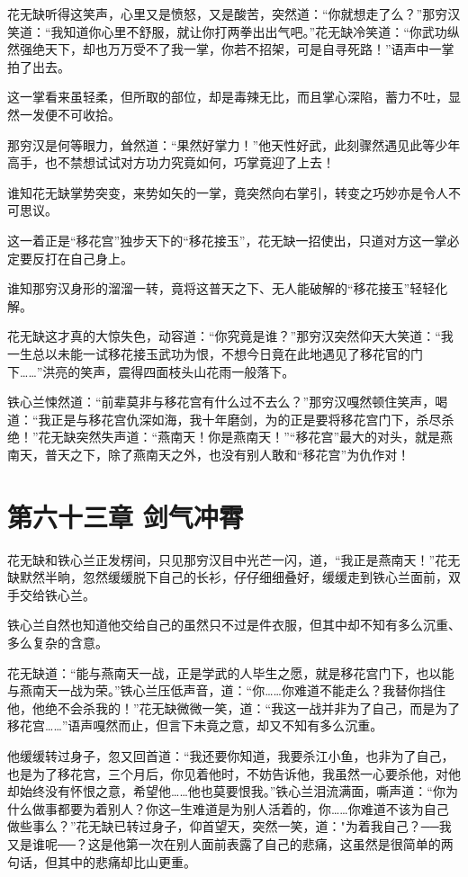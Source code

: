 \documentclass[12pt,oneside]{book}
\begin{document}
花无缺听得这笑声，心里又是愤怒，又是酸苦，突然道：``你就想走了么？''那穷汉笑道：``我知道你心里不舒服，就让你打两拳出出气吧。''花无缺冷笑道：``你武功纵然强绝天下，却也万万受不了我一掌，你若不招架，可是自寻死路！''语声中一掌拍了出去。

这一掌看来虽轻柔，但所取的部位，却是毒辣无比，而且掌心深陷，蓄力不吐，显然一发便不可收拾。

那穷汉是何等眼力，耸然道：``果然好掌力！''他天性好武，此刻骤然遇见此等少年高手，也不禁想试试对方功力究竟如何，巧掌竟迎了上去！

谁知花无缺掌势突变，来势如矢的一掌，竟突然向右掌引，转变之巧妙亦是令人不可思议。

这一着正是``移花宫''独步天下的``移花接玉''，花无缺一招使出，只道对方这一掌必定要反打在自己身上。

谁知那穷汉身形的溜溜一转，竟将这普天之下、无人能破解的``移花接玉''轻轻化解。

花无缺这才真的大惊失色，动容道：``你究竟是谁？''那穷汉突然仰天大笑道：``我一生总以未能一试移花接玉武功为恨，不想今日竟在此地遇见了移花官的门下\ldots\ldots{}''洪亮的笑声，震得四面枝头山花雨一般落下。

铁心兰悚然道：``前辈莫非与移花宫有什么过不去么？''那穷汉嘎然顿住笑声，喝道：``我正是与移花宫仇深如海，我十年磨剑，为的正是要将移花宫门下，杀尽杀绝！''花无缺突然失声道：``燕南天！你是燕南天！''``移花宫''最大的对头，就是燕南天，普天之下，除了燕南天之外，也没有别人敢和``移花宫''为仇作对！

\hypertarget{ux7b2cux516dux5341ux4e09ux7ae0-ux5251ux6c14ux51b2ux9704}{%
\chapter{第六十三章
剑气冲霄}\label{ux7b2cux516dux5341ux4e09ux7ae0-ux5251ux6c14ux51b2ux9704}}

花无缺和铁心兰正发楞间，只见那穷汉目中光芒一闪，道，``我正是燕南天！''花无缺默然半晌，忽然缓缓脱下自己的长衫，仔仔细细叠好，缓缓走到铁心兰面前，双手交给铁心兰。

铁心兰自然也知道他交给自己的虽然只不过是件衣服，但其中却不知有多么沉重、多么复杂的含意。

花无缺道：``能与燕南天一战，正是学武的人毕生之愿，就是移花宫门下，也以能与燕南天一战为荣。''铁心兰压低声音，道：``你\ldots\ldots 你难道不能走么？我替你挡住他，他绝不会杀我的！''花无缺微微一笑，道：``我这一战并非为了自己，而是为了移花宫\ldots\ldots{}''语声嘎然而止，但言下未竟之意，却又不知有多么沉重。

他缓缓转过身子，忽又回首道：``我还要你知道，我要杀江小鱼，也非为了自己，也是为了移花宫，三个月后，你见着他时，不妨告诉他，我虽然一心要杀他，对他却始终没有怀恨之意，希望他\ldots\ldots 他也莫要恨我。''铁心兰泪流满面，嘶声道：``你为什么做事都要为着别人？你这─生难道是为别人活着的，你\ldots\ldots 你难道不该为自己做些事么？''花无缺已转过身子，仰首望天，突然一笑，道："为着我自己？──我又是谁呢──？这是他第一次在别人面前表露了自己的悲痛，这虽然是很简单的两句话，但其中的悲痛却比山更重。
\end{document}
